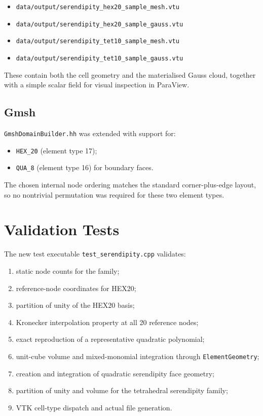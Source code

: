 \begin{itemize}[nosep]
  \item \texttt{data/output/serendipity\_hex20\_sample\_mesh.vtu}
  \item \texttt{data/output/serendipity\_hex20\_sample\_gauss.vtu}
  \item \texttt{data/output/serendipity\_tet10\_sample\_mesh.vtu}
  \item \texttt{data/output/serendipity\_tet10\_sample\_gauss.vtu}
\end{itemize}

These contain both the cell geometry and the materialised Gauss cloud, together
with a simple scalar field for visual inspection in ParaView.

\subsection{Gmsh}

\texttt{GmshDomainBuilder.hh} was extended with support for:

\begin{itemize}[nosep]
  \item \texttt{HEX\_20} (element type 17);
  \item \texttt{QUA\_8} (element type 16) for boundary faces.
\end{itemize}

The chosen internal node ordering matches the standard corner-plus-edge layout,
so no nontrivial permutation was required for these two element types.


\section{Validation Tests}
\label{sec:serendipity_tests}

The new test executable \texttt{test\_serendipity.cpp} validates:

\begin{enumerate}[nosep]
  \item static node counts for the family;
  \item reference-node coordinates for HEX20;
  \item partition of unity of the HEX20 basis;
  \item Kronecker interpolation property at all 20 reference nodes;
  \item exact reproduction of a representative quadratic polynomial;
  \item unit-cube volume and mixed-monomial integration through
        \texttt{ElementGeometry};
  \item creation and integration of quadratic serendipity face geometry;
  \item partition of unity and volume for the tetrahedral serendipity family;
  \item VTK cell-type dispatch and actual file generation.
\end{enumerate}


